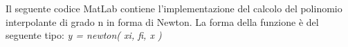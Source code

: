 Il seguente codice MatLab contiene l'implementazione del calcolo del polinomio interpolante di grado n in forma di Newton. La forma della funzione è del seguente tipo: \textit{y = newton( xi, fi, x )}\\\
